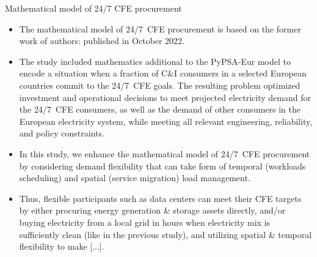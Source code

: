 \begin{frame}{Mathematical model of 24/7 CFE procurement}

  {\footnotesize
  \begin{itemize}
  \item The mathematical model of 24/7~CFE procurement is based on the former work of authors:  published in October 2022.

  \item The study included mathematics additional to the PyPSA-Eur model to encode a situation when a fraction of C\&I consumers in a selected European countries commit to the 24/7~CFE goals. The resulting problem optimized investment and operational decisions to meet projected electricity demand for the 24/7~CFE consumers, as well as the demand of other consumers in the European electricity system, while meeting all relevant engineering, reliability, and policy constraints.
  
  \item In this study, we enhance the mathematical model of 24/7~CFE procurement 
  by considering demand flexibility that can take form of \alert{temporal} (workloads scheduling) and \alert{spatial} (service migration) load management. 
  
  \item Thus, flexible participants such as data centers can meet their CFE targets by either procuring energy generation \& storage assets directly, and/or buying electricity from a local grid in hours when electricity mix is sufficiently clean  (like in the previous study), and utilizing spatial \& temporal flexibility \alert{to make [...]}.

  \end{itemize}
  }

\end{frame}



